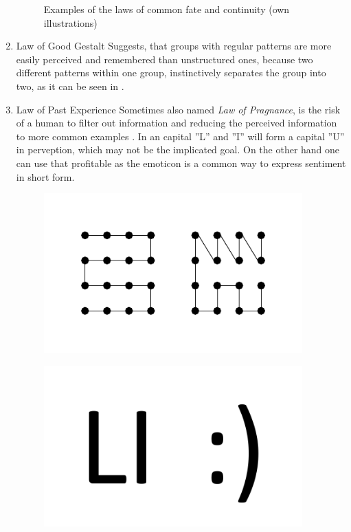 \begin{enumerate}
\begin{figure}[H]
\begin{minipage}[b]{.5\linewidth}
            \label{fig:con}
        \end{minipage}
        \caption[Laws of Common Fate and Continuity]{Examples of the laws of common fate and continuity (own illustrations)}\label{fig:law3}
    \end{figure}
    \item{Law of Good Gestalt} Suggests, that groups with regular patterns are more easily perceived and remembered than unstructured ones, because two different patterns within one group, instinctively separates the group into two, as it can be seen in  \parencite{Todorovic.2008}.
    \item{Law of Past Experience} Sometimes also named \textit{Law of Pragnance}, is the risk of a human to filter out information and reducing the perceived information to more common examples \parencite{Stevenson.n.y.}. In  an capital ''L'' and ''I'' will form a capital ''U'' in perveption, which may not be the implicated goal. On the other hand one can use that profitable as the emoticon is a common way to express sentiment in short form.
    \begin{figure}[H] 
        \begin{minipage}[b]{.5\linewidth}
            \centering\includegraphics[width=0.94\textwidth]{img/gestalt.pdf}
            \label{fig:gest}
        \end{minipage}%
        \begin{minipage}[b]{.5\linewidth}
            \centering\includegraphics[width=0.94\textwidth]{img/experience.pdf}

\end{minipage}
\end{figure}
\end{enumerate}
